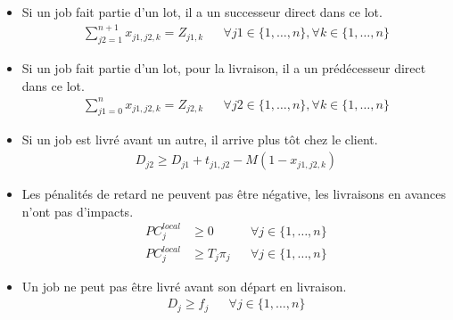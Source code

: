 \documentclass{article}
\begin{document}
\begin{itemize}
	\item
	      Si un job fait partie d’un lot, il a un successeur direct dans ce lot.
	      \begin{align}
		      \sum_{j2=1}^{n+1} x_{j1,j2,k} = Z_{j1,k} &  &
		      \forall j1 \in\{ 1, \ldots, n\}, \forall k \in\{1, \ldots, n\}
	      \end{align}
	\item
	      Si un job fait partie d’un lot, pour la livraison, il a un prédécesseur direct dans ce lot.
	      \begin{align}
		      \sum_{j1=0}^{n} x_{j1,j2,k} = Z_{j2,k} &  &
		      \forall j2 \in\{ 1, \ldots, n\}, \forall k \in\{1, \ldots, n\}
	      \end{align}
	\item
	      Si un job est livré avant un autre, il arrive plus tôt chez le client.
	      \begin{align}
		      D_{j2}\geq D_{j1} + t_{j1,j2} - M \left(1-x_{j1,j2,k} \right)
	      \end{align}
	\item
	      Les pénalités de retard ne peuvent pas être négative, les livraisons en avances n’ont pas d’impacts.
	      \begin{align}
		      {PC}_j^{local} & \geq 0         &  & \forall j \in\{1, \ldots, n\} \\
		      {PC}_j^{local} & \geq T_j \pi_j &  & \forall j \in\{1, \ldots, n\}
	      \end{align}
	\item
	      Un job ne peut pas être livré avant son départ en livraison.
	      \begin{align}
		      D_j \geq f_j &  & \forall j \in\{1, \ldots, n\}
	      \end{align}
\end{itemize}
\end{document}
